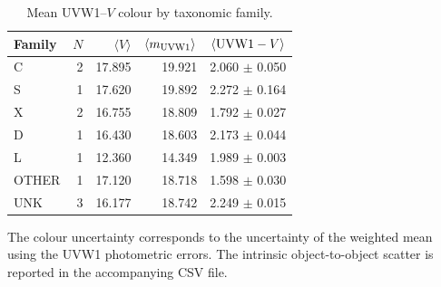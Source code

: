 \begin{table}[t]
\centering
\scriptsize
\caption{Mean UVW1--$V$ colour by taxonomic family.}
\label{tab:taxonomy_colour_summary}
\begin{tabular}{lrrrr}
\hline
Family & $N$ & $\langle V \rangle$ & $\langle m_{\rm UVW1} \rangle$ & $\langle {\rm UVW1}-V \rangle$ \\
\hline
C & 2 & 17.895 & 19.921 & 2.060 $\pm$ 0.050 \\
S & 1 & 17.620 & 19.892 & 2.272 $\pm$ 0.164 \\
X & 2 & 16.755 & 18.809 & 1.792 $\pm$ 0.027 \\
D & 1 & 16.430 & 18.603 & 2.173 $\pm$ 0.044 \\
L & 1 & 12.360 & 14.349 & 1.989 $\pm$ 0.003 \\
OTHER & 1 & 17.120 & 18.718 & 1.598 $\pm$ 0.030 \\
UNK & 3 & 16.177 & 18.742 & 2.249 $\pm$ 0.015 \\
\hline
\end{tabular}

\vspace{0.5ex}
\footnotesize
The colour uncertainty corresponds to the uncertainty of the weighted mean using the UVW1 photometric errors. The intrinsic object-to-object scatter is reported in the accompanying CSV file.
\end{table}

